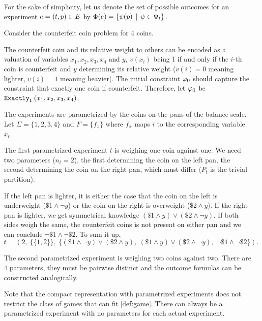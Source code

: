 For the sake of simplicity, let us denote the set of possible outcomes for
  an experiment $e = (t, p) \in E$ by
  $\Phi(e) = \{ \psi(p) \:\:|\:\: \psi\in\Phi_t\}$.

\begin{example}
Consider the counterfeit coin problem for 4 coins.

The counterfeit coin and its relative weight to others can be encoded
  as a valuation of variables $x_1, x_2, x_3, x_4$ and $y$,
  $v(x_i)$ being 1 if and only if the $i$-th coin is counterfeit and
  $y$ determining its relative weight
  ($v(i) = 0$ meaning lighter, $v(i) = 1$ meaning heavier).
The initial constraint $\varphi_0$ should capture the constraint that exactly one
  coin if counterfeit.
Therefore, let $\varphi_0$ be $\mathtt{Exactly}_{1}\:(x_1, x_2, x_3, x_4)$.

The experiments are parametrized by the coins on the pans of the balance scale.
Let $\Sigma = \{1, 2, 3, 4\}$ and $F = \{ f_x \}$ where $f_x$
maps $i$ to the corresponding variable $x_i$.

The first parametrized experiment $t$ is weighing one coin against one.
We need two parameters ($n_t = 2$),
  the first determining the coin on the left pan,
  the second determining the coin on the right pan, which must differ
  ($P_t$ is the trivial partition).

If the left pan is lighter, it is either the case that the
  coin on the left is underweight ($\$1 \wedge \neg y$)
  or the coin on the right is overweight ($\$2 \wedge y$).
If the right pan is lighter, we get symmetrical knowledge
  $(\$1\wedge y) \vee (\$2\wedge\neg y)$.
If both sides weigh the same, the counterfeit coins is not present on either pan
  and we can conclude $\neg \$1 \wedge \neg \$2$.
To sum it up,
  \[
  t = \left(2,\; \big\{\{1,2\}\big\},\; \big\{
    (\$1\wedge \neg y) \vee (\$2\wedge y), \;
    (\$1\wedge y) \vee (\$2\wedge\neg y), \;
    \neg \$1 \wedge \neg \$2
    \big\}\right).
  \]

The second parametrized experiment is weighing two coins against two.
There are $4$ parameters, they must be pairwise distinct and the outcome
  formulas can be constructed analogically. \eqed
\end{example}


Note that the compact representation with parametrized experiments
  does not restrict the class of games that can fit \autoref{def:game}.
There can always be a parametrized experiment with no parameters for
  each actual experiment.

